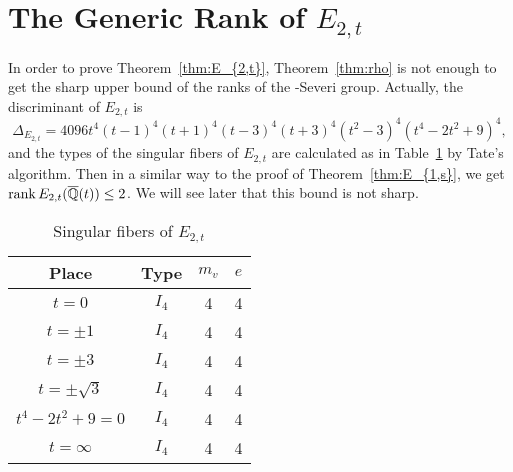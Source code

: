 \documentclass[main]{subfiles}
\begin{document}
\section{The Generic Rank of \texorpdfstring{$E_{2,t}$}{E2,t}}

In order to prove Theorem~\ref{thm:E_{2,t}}, Theorem~\ref{thm:rho} is not enough to get the sharp upper bound of the ranks of the \Neron-Severi group.
Actually, the discriminant of $E_{2,t}$ is
\begin{equation*}
    \Delta_{E_{2,t}} = 4096t^{4}(t - 1)^{4}(t + 1)^{4}(t - 3)^{4}(t + 3)^{4}(t^{2} - 3)^{4}(t^{4} - 2t^{2} + 9)^{4},
\end{equation*}
and the types of the singular fibers of $E_{2,t}$ are calculated as in Table~\ref{tab:E_{2,t}} by Tate's algorithm.
Then in a similar way to the proof of Theorem~\ref{thm:E_{1,s}}, we get $\operatorname{rank} E_{2,t}(\overline{\mathbb{Q}}(t)) \leq 2$.
We will see later that this bound is not sharp.
\begin{table}[H]
    \centering
    \caption{Singular fibers of $E_{2,t}$}
    \begin{tabular}{|c|c|c|c|}
        \hline
        Place            & Type  & $m_v$ & $e$ \\
        \hline
        $t=0$            & $I_4$ & 4     & 4   \\
        $t=\pm 1$        & $I_4$ & 4     & 4   \\
        $t=\pm 3$        & $I_4$ & 4     & 4   \\
        $t=\pm \sqrt{3}$ & $I_4$ & 4     & 4   \\
        $t^4-2t^2+9=0$   & $I_4$ & 4     & 4   \\
        $t=\infty$       & $I_4$ & 4     & 4   \\
        \hline
    \end{tabular}
    \label{tab:E_{2,t}}
\end{table}
\end{document}
